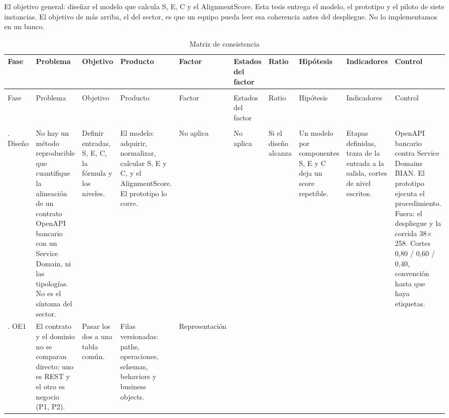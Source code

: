 El objetivo general: diseñar el modelo que calcula S, E, C y el AlignmentScore. Esta tesis entrega el modelo, el prototipo y el piloto de siete instancias. El objetivo de más arriba, el del sector, es que un equipo pueda leer esa coherencia antes del despliegue. No lo implementamos en un banco.

\begin{landscape}
\scriptsize
\setlength{\tabcolsep}{2pt}
\setlength{\LTleft}{0pt}
\setlength{\LTright}{0pt}
\begin{longtable}{@{}>{\raggedright\arraybackslash}p{2.15cm}>{\raggedright\arraybackslash}p{2.45cm}>{\raggedright\arraybackslash}p{2.45cm}>{\raggedright\arraybackslash}p{2.45cm}>{\raggedright\arraybackslash}p{1.7cm}>{\raggedright\arraybackslash}p{2.55cm}>{\raggedright\arraybackslash}p{2.15cm}>{\raggedright\arraybackslash}p{2.45cm}>{\raggedright\arraybackslash}p{2.55cm}>{\raggedright\arraybackslash}p{2.55cm}@{}}
\caption{Matriz de consistencia} \label{tab:consistencia} \\
\toprule
Fase & Problema & Objetivo & Producto & Factor & Estados del factor & Ratio & Hipótesis & Indicadores & Control \\
\midrule
\endfirsthead
\multicolumn{10}{l}{\textit{(continúa)}} \\
\midrule
Fase & Problema & Objetivo & Producto & Factor & Estados del factor & Ratio & Hipótesis & Indicadores & Control \\
\midrule
\endhead
\midrule
\multicolumn{10}{r}{\textit{(continúa)}} \\
\endfoot
\bottomrule
\endlastfoot
1. Diseño &
No hay un método reproducible que cuantifique la alineación de un contrato OpenAPI bancario con un Service Domain, ni las tipologías. No es el síntoma del sector. &
Definir entradas, S, E, C, la fórmula y los niveles. &
El modelo: adquirir, normalizar, calcular S, E y C, y el AlignmentScore. El prototipo lo corre. &
No aplica &
No aplica &
Si el diseño alcanza &
Un modelo por componentes S, E y C deja un score repetible. &
Etapas definidas, traza de la entrada a la salida, cortes de nivel escritos. &
OpenAPI bancario contra Service Domains BIAN. El prototipo ejecuta el procedimiento. Fuera: el despliegue y la corrida 38$\times$258. Cortes 0,80 / 0,60 / 0,40, convención hasta que haya etiquetas. \\
2. OE1 &
El contrato y el dominio no se comparan directo: uno es REST y el otro es negocio (P1, P2). &
Pasar los dos a una tabla común. &
Filas versionadas: paths, operaciones, schemas, behaviors y business objects. &
Representación &

\end{longtable}
\end{landscape}
